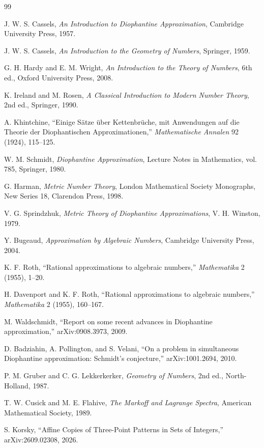 \documentclass[11pt,a4paper]{article}
\begin{document}
\begin{thebibliography}{99}

J. W. S. Cassels,
\emph{An Introduction to Diophantine Approximation},
Cambridge University Press, 1957.

J. W. S. Cassels,
\emph{An Introduction to the Geometry of Numbers},
Springer, 1959.

G. H. Hardy and E. M. Wright,
\emph{An Introduction to the Theory of Numbers},
6th ed., Oxford University Press, 2008.

K. Ireland and M. Rosen,
\emph{A Classical Introduction to Modern Number Theory},
2nd ed., Springer, 1990.

A. Khintchine,
``Einige Sätze über Kettenbrüche, mit Anwendungen auf die Theorie der Diophantischen Approximationen,''
\emph{Mathematische Annalen} 92 (1924), 115--125.

W. M. Schmidt,
\emph{Diophantine Approximation},
Lecture Notes in Mathematics, vol. 785, Springer, 1980.

G. Harman,
\emph{Metric Number Theory},
London Mathematical Society Monographs, New Series 18, Clarendon Press, 1998.

V. G. Sprindzhuk,
\emph{Metric Theory of Diophantine Approximations},
V. H. Winston, 1979.

Y. Bugeaud,
\emph{Approximation by Algebraic Numbers},
Cambridge University Press, 2004.

K. F. Roth,
``Rational approximations to algebraic numbers,''
\emph{Mathematika} 2 (1955), 1--20.

H. Davenport and K. F. Roth,
``Rational approximations to algebraic numbers,''
\emph{Mathematika} 2 (1955), 160--167.

M. Waldschmidt,
``Report on some recent advances in Diophantine approximation,''
arXiv:0908.3973, 2009.

D. Badziahin, A. Pollington, and S. Velani,
``On a problem in simultaneous Diophantine approximation: Schmidt's conjecture,''
arXiv:1001.2694, 2010.

P. M. Gruber and C. G. Lekkerkerker,
\emph{Geometry of Numbers}, 2nd ed., North-Holland, 1987.

T. W. Cusick and M. E. Flahive,
\emph{The Markoff and Lagrange Spectra},
American Mathematical Society, 1989.

S. Korsky,
``Affine Copies of Three-Point Patterns in Sets of Integers,''
arXiv:2609.02308, 2026.

\end{thebibliography}
\end{document}
